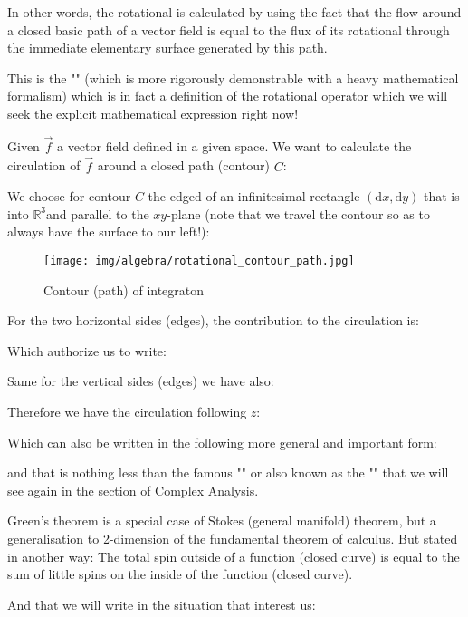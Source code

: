 	\begin{theorem}
	In other words, the rotational is calculated by using the fact that the flow around a closed basic path of a vector field is equal to the flux of its rotational through the immediate elementary surface generated by this path.

	This is the "\label{stokes theorem}" (which is more rigorously demonstrable with a heavy mathematical formalism) which is in fact a definition of the rotational operator which we will seek the explicit mathematical expression right now!
	\end{theorem}
	\begin{dem}
	Given $\vec{f}$ a vector field defined in a given space. We want to calculate the circulation of $\vec{f}$ around a closed path (contour) $C$:
	
	We choose for contour $C$ the edged of an infinitesimal rectangle $(\mathrm{d}x,\mathrm{d}y)$ that is into $\mathbb{R}^3$and parallel to the $xy$-plane (note that we travel the contour so as to always have the surface to our left!):
	\begin{figure}[H]
		\centering
		\texttt{[image: img/algebra/rotational\_contour\_path.jpg]}
		\caption[]{Contour (path) of integraton}
	\end{figure}
	For the two horizontal sides (edges), the contribution to the circulation is:
	
	Which authorize us to write:
	
	Same for the vertical sides  (edges) we have also:
	
	Therefore we have the circulation following $z$:
	
	Which can also be written in the following more general and important form:
	
	and that is nothing less than the famous "\label{green theorem}" or also known as the "" that we will see again in the section of Complex Analysis.
	
	Green's theorem is a special case of Stokes (general manifold) theorem, but a generalisation to 2-dimension of the fundamental theorem of calculus. But stated in another way: The total spin outside of a function (closed curve) is equal to the sum of little spins on the inside of the function (closed curve).
	
	And that we will write in the situation that interest us:
	

\end{dem}

